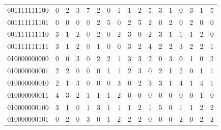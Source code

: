 \documentclass[10pt,a4paper]{article}
\begin{document}
\begin{longtable}{ |c|c|c|c|c|c|c|c|c|c|c|c|c|c|c|c|c| }
    001111111100              & 0                            & 2                                & 3                            & 7                              & 2   & 0   & 1   & 1   & 2   & 5   & 3   & 1   & 0   & 3   & 1   & 5   \\
    001111111101              & 0                            & 0                                & 0                            & 0                              & 2   & 5   & 0   & 2   & 5   & 2   & 0   & 2   & 0   & 2   & 0   & 0   \\
    001111111110              & 3                            & 1                                & 2                            & 0                              & 2   & 0   & 2   & 3   & 0   & 2   & 3   & 1   & 1   & 1   & 2   & 0   \\
    001111111111              & 3                            & 1                                & 2                            & 0                              & 1   & 0   & 0   & 3   & 2   & 4   & 2   & 2   & 3   & 2   & 2   & 1   \\
    010000000000              & 0                            & 0                                & 3                            & 0                              & 2   & 2   & 1   & 3   & 3   & 2   & 0   & 3   & 0   & 1   & 0   & 2   \\
    010000000001              & 2                            & 2                                & 0                            & 0                              & 0   & 1   & 1   & 2   & 3   & 0   & 2   & 1   & 2   & 0   & 1   & 1   \\
    010000000010              & 2                            & 1                                & 3                            & 0                              & 0   & 0   & 3   & 0   & 2   & 3   & 3   & 1   & 4   & 1   & 4   & 1   \\
    010000000011              & 4                            & 3                                & 2                            & 1                              & 1   & 1   & 2   & 0   & 0   & 0   & 0   & 0   & 0   & 0   & 1   & 0   \\
    010000000100              & 3                            & 1                                & 0                            & 1                              & 3   & 1   & 1   & 1   & 2   & 1   & 5   & 0   & 1   & 1   & 2   & 2   \\
    010000000101              & 0                            & 2                                & 0                            & 3                              & 0   & 1   & 2   & 2   & 2   & 0   & 0   & 0   & 2   & 0   & 2   & 2   \\

\end{longtable}
\end{document}
